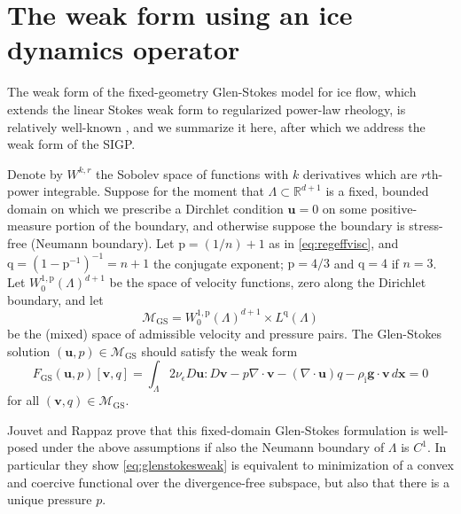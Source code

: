 \documentclass[letterpaper,final,12pt,reqno]{amsart}
\theoremstyle{claim}
\newcommand{\eps}{\epsilon}
\newcommand{\RR}{\mathbb{R}}
\newcommand{\Div}{\nabla\cdot}
\newcommand{\bg}{\mathbf{g}}
\newcommand{\bu}{\mathbf{u}}
\newcommand{\bv}{\mathbf{v}}
\newcommand{\bx}{\mathbf{x}}
\newcommand{\rhoi}{\rho_{\text{i}}}
\newcommand{\pp}{{\text{p}}}
\newcommand{\qq}{{\text{q}}}
\numberwithin{equation}{section}
\numberwithin{figure}{section}
\numberwithin{table}{section}
\numberwithin{theorem}{section}
\begin{document}
\section{The weak form using an ice dynamics operator} \label{sec:weakido}

The weak form of the fixed-geometry Glen-Stokes model for ice flow, which extends the linear Stokes weak form \cite{Elmanetal2014} to regularized power-law rheology, is relatively well-known \cite{IsaacStadlerGhattas2015,JouvetRappaz2011,Lengetal2012}, and we summarize it here, after which we address the weak form of the SIGP.

Denote by $W^{k,r}$ the Sobolev space \cite{Evans2010} of functions with $k$ derivatives which are $r$th-power integrable.  Suppose for the moment that $\Lambda \subset \RR^{d+1}$ is a fixed, bounded domain on which we prescribe a Dirchlet condition $\bu=0$ on some positive-measure portion of the boundary, and otherwise suppose the boundary is stress-free (Neumann boundary).  Let $\pp=(1/n)+1$ as in \eqref{eq:regeffvisc}, and $\qq=(1-\pp^{-1})^{-1}=n+1$ the conjugate exponent; $\pp=4/3$ and $\qq = 4$ if $n=3$.  Let $W_0^{1,\pp}(\Lambda)^{d+1}$ be the space of velocity functions, zero along the Dirichlet boundary, and let
\begin{equation}
\mathcal{M}_{\text{GS}} = W_0^{1,\pp}(\Lambda)^{d+1} \times L^\qq(\Lambda)  \label{eq:mixed}
\end{equation}
be the (mixed) space of admissible velocity and pressure pairs.  The Glen-Stokes solution $(\bu,p) \in \mathcal{M}_{\text{GS}}$ should satisfy the weak form
\begin{equation}
F_{\text{GS}}(\bu,p)[\bv,q] = \int_\Lambda 2 \nu_\eps D\bu : D\bv - p \Div\bv - (\Div\bu) q - \rhoi \bg \cdot \bv\,d\bx = 0 \label{eq:glenstokesweak}
\end{equation}
for all $(\bv,q) \in \mathcal{M}_{\text{GS}}$.

Jouvet and Rappaz \cite{JouvetRappaz2011} prove that this fixed-domain Glen-Stokes formulation is well-posed under the above assumptions if also the Neumann boundary of $\Lambda$ is $C^1$.  In particular they show \eqref{eq:glenstokesweak} is equivalent to minimization of a convex and coercive functional over the divergence-free subspace, but also that there is a unique pressure $p$.
\end{document}
